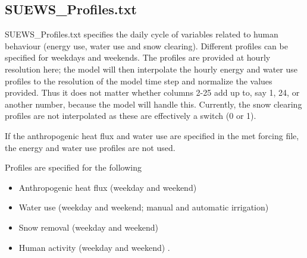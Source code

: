\documentclass[letterpaper,10pt,english]{sphinxmanual}
\begin{document}
\subsection{SUEWS\_Profiles.txt}
\label{\detokenize{input_files/SUEWS_SiteInfo/SUEWS_Profiles::doc}}\label{\detokenize{input_files/SUEWS_SiteInfo/SUEWS_Profiles:suews-profiles-txt}}
SUEWS\_Profiles.txt specifies the daily cycle of variables related to
human behaviour (energy use, water use and snow clearing). Different
profiles can be specified for weekdays and weekends. The profiles are
provided at hourly resolution here; the model will then interpolate the
hourly energy and water use profiles to the resolution of the model time
step and normalize the values provided. Thus it does not matter whether
columns 2-25 add up to, say 1, 24, or another number, because the model
will handle this. Currently, the snow clearing profiles are not
interpolated as these are effectively a switch (0 or 1).

If the anthropogenic heat flux and water use are specified in the met
forcing file, the energy and water use profiles are not used.

Profiles are specified for the following
\begin{itemize}
\item {} 
Anthropogenic heat flux (weekday and weekend)

\item {} 
Water use (weekday and weekend; manual and automatic irrigation)

\item {} 
Snow removal (weekday and weekend)

\item {} 
Human activity (weekday and weekend) .

\end{itemize}
\end{document}
